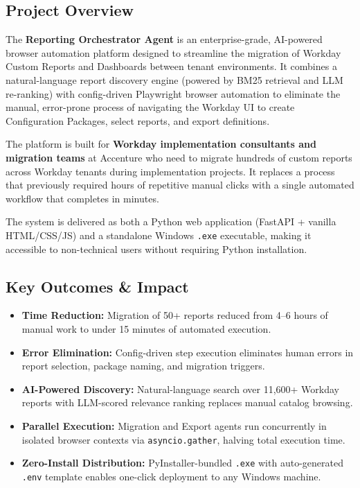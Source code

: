 \documentclass[12pt,a4paper]{article}
\begin{document}
\subsection{Project Overview}
\label{subsec:project-overview}

The \textbf{Reporting Orchestrator Agent} is an enterprise-grade, AI-powered browser automation platform designed to streamline the migration of Workday Custom Reports and Dashboards between tenant environments. It combines a natural-language report discovery engine (powered by BM25 retrieval and LLM re-ranking) with config-driven Playwright browser automation to eliminate the manual, error-prone process of navigating the Workday UI to create Configuration Packages, select reports, and export definitions.

The platform is built for \textbf{Workday implementation consultants and migration teams} at Accenture who need to migrate hundreds of custom reports across Workday tenants during implementation projects. It replaces a process that previously required hours of repetitive manual clicks with a single automated workflow that completes in minutes.

The system is delivered as both a Python web application (FastAPI + vanilla HTML/CSS/JS) and a standalone Windows \texttt{.exe} executable, making it accessible to non-technical users without requiring Python installation.

\subsection{Key Outcomes \& Impact}
\label{subsec:key-outcomes}

\begin{itemize}[leftmargin=2em]
  \item \textbf{Time Reduction:} Migration of 50+ reports reduced from 4--6 hours of manual work to under 15 minutes of automated execution.
  \item \textbf{Error Elimination:} Config-driven step execution eliminates human errors in report selection, package naming, and migration triggers.
  \item \textbf{AI-Powered Discovery:} Natural-language search over 11,600+ Workday reports with LLM-scored relevance ranking replaces manual catalog browsing.
  \item \textbf{Parallel Execution:} Migration and Export agents run concurrently in isolated browser contexts via \texttt{asyncio.gather}, halving total execution time.
  \item \textbf{Zero-Install Distribution:} PyInstaller-bundled \texttt{.exe} with auto-generated \texttt{.env} template enables one-click deployment to any Windows machine.
\end{itemize}
\end{document}
